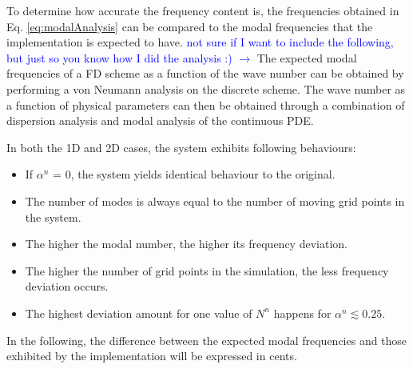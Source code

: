 \documentclass[fleqn]{jaes}
\def\SWcomment[#1]{\textcolor{blue}{#1}}
\begin{document}
To determine how accurate the frequency content is, the frequencies obtained in Eq. \eqref{eq:modalAnalysis} can be compared to the modal frequencies that the implementation is expected to have. \SWcomment[not sure if I want to include the following, but just so you know how I did the analysis :) $\rightarrow$]
The expected modal frequencies of a FD scheme as a function of the wave number can be obtained by performing a von Neumann analysis on the discrete scheme. The wave number as a function of physical parameters can then be obtained through a combination of dispersion analysis and modal analysis of the continuous PDE. 


In both the 1D and 2D cases, the system exhibits following behaviours:
\begin{itemize}
    \item If $\alpha^n$ = 0, the system yields identical behaviour to the original. 
    \item The number of modes is always equal to the number of moving grid points in the system.
    \item The higher the modal number, the higher its frequency deviation.
    \item The higher the number of grid points in the simulation, the less frequency deviation occurs.
    \item The highest deviation amount for one value of $N^n$ happens for $\alpha^n \lesssim 0.25$.
\end{itemize}

In the following, the difference between the expected modal frequencies and those exhibited by the implementation will be expressed in cents.

\end{document}
